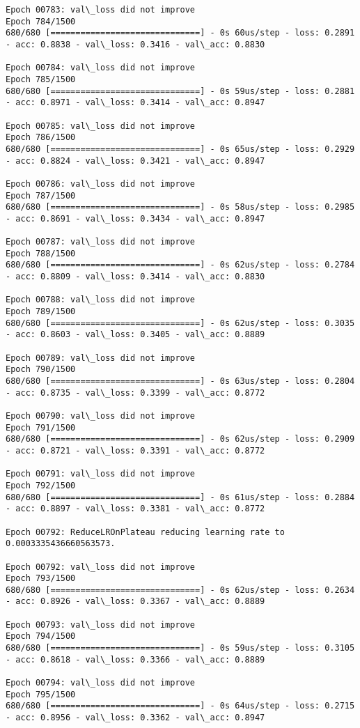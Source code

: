 \documentclass[11pt]{article}
\begin{document}
\begin{Verbatim}[commandchars=\\\{\}]
Epoch 00783: val\_loss did not improve
Epoch 784/1500
680/680 [==============================] - 0s 60us/step - loss: 0.2891 - acc: 0.8838 - val\_loss: 0.3416 - val\_acc: 0.8830

Epoch 00784: val\_loss did not improve
Epoch 785/1500
680/680 [==============================] - 0s 59us/step - loss: 0.2881 - acc: 0.8971 - val\_loss: 0.3414 - val\_acc: 0.8947

Epoch 00785: val\_loss did not improve
Epoch 786/1500
680/680 [==============================] - 0s 65us/step - loss: 0.2929 - acc: 0.8824 - val\_loss: 0.3421 - val\_acc: 0.8947

Epoch 00786: val\_loss did not improve
Epoch 787/1500
680/680 [==============================] - 0s 58us/step - loss: 0.2985 - acc: 0.8691 - val\_loss: 0.3434 - val\_acc: 0.8947

Epoch 00787: val\_loss did not improve
Epoch 788/1500
680/680 [==============================] - 0s 62us/step - loss: 0.2784 - acc: 0.8809 - val\_loss: 0.3414 - val\_acc: 0.8830

Epoch 00788: val\_loss did not improve
Epoch 789/1500
680/680 [==============================] - 0s 62us/step - loss: 0.3035 - acc: 0.8603 - val\_loss: 0.3405 - val\_acc: 0.8889

Epoch 00789: val\_loss did not improve
Epoch 790/1500
680/680 [==============================] - 0s 63us/step - loss: 0.2804 - acc: 0.8735 - val\_loss: 0.3399 - val\_acc: 0.8772

Epoch 00790: val\_loss did not improve
Epoch 791/1500
680/680 [==============================] - 0s 62us/step - loss: 0.2909 - acc: 0.8721 - val\_loss: 0.3391 - val\_acc: 0.8772

Epoch 00791: val\_loss did not improve
Epoch 792/1500
680/680 [==============================] - 0s 61us/step - loss: 0.2884 - acc: 0.8897 - val\_loss: 0.3381 - val\_acc: 0.8772

Epoch 00792: ReduceLROnPlateau reducing learning rate to 0.0003335436660563573.

Epoch 00792: val\_loss did not improve
Epoch 793/1500
680/680 [==============================] - 0s 62us/step - loss: 0.2634 - acc: 0.8926 - val\_loss: 0.3367 - val\_acc: 0.8889

Epoch 00793: val\_loss did not improve
Epoch 794/1500
680/680 [==============================] - 0s 59us/step - loss: 0.3105 - acc: 0.8618 - val\_loss: 0.3366 - val\_acc: 0.8889

Epoch 00794: val\_loss did not improve
Epoch 795/1500
680/680 [==============================] - 0s 64us/step - loss: 0.2715 - acc: 0.8956 - val\_loss: 0.3362 - val\_acc: 0.8947


\end{Verbatim}
\end{document}
